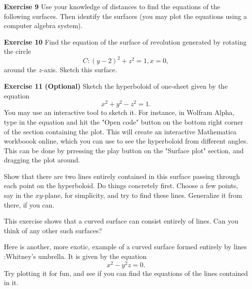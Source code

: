 \documentclass[12pt,oneside]{exam}
\newenvironment{exercise}[1]{\vspace{.1in}\noindent\textbf{Exercise #1 \hspace{.05em}}}{}
\begin{document}
\begin{exercise}{9}
Use your knowledge of distances to find the equations of the following surfaces. Then identify the surfaces (you may plot the equations using a computer algebra system). 
\end{exercise}

\begin{exercise}{10} 
Find the equation of the surface of revolution generated by rotating the circle 
\begin{equation*}
C \colon (y-2)^2 + z^2 = 1, x=0,
\end{equation*}
around the $z$-axis. Sketch this surface. 
\end{exercise}

\begin{exercise}{11}\textbf{(Optional)}
Sketch the hyperboloid of one-sheet given by the equation
\begin{equation*}
x^2+y^2-z^2=1.
\end{equation*}
You may use an interactive tool to sketch it. For instance, in Wolfram Alpha, type in the equation and hit the "Open code" button on the bottom right corner of the section containing the plot. This will create an interactive Mathematica workboook online, which you can use to see the hyperboloid from different angles. This can be done by prressing the play button on the "Surface plot" section, and dragging the plot around. 

Show that there are two lines entirely contained in this surface passing through each point on the hyperboloid. Do things concretely first. Choose a few points, say in the $xy$-plane, for simplicity, and try to find these lines. Generalize it from there, if you can. 

This exercise shows that a curved surface can consist entirely of lines. Can you think of any other such surfaces? 

Here is another, more exotic, example of a curved surface formed entirely by lines :Whitney's umbrella. It is given by the equation 
\begin{equation*}
x^2-y^2z=0.
\end{equation*}
Try plotting it for fun, and see if you can find the equations of the lines contained in it.
\end{exercise}
\end{document}
